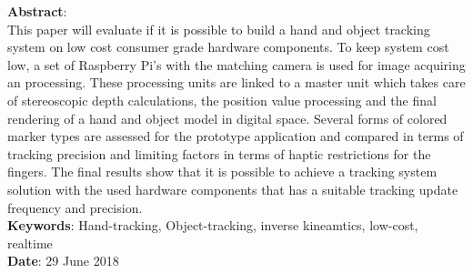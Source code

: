 \begin{titlepage}
\textbf{Abstract}: \\This paper will evaluate if it is possible to build a hand and object tracking system on low cost consumer grade hardware components. To keep system cost low, a set of Raspberry Pi's with the matching camera is used for image acquiring an processing. These processing units are linked to a master unit which takes care of stereoscopic depth calculations, the position value processing and the final rendering of a hand and object model in digital space. Several forms of colored marker types are assessed for the prototype application and compared in terms of tracking precision and limiting factors in terms of haptic restrictions for the fingers. The final results show that it is possible to achieve a tracking system solution with the used hardware components that has a suitable tracking update frequency and precision.\\
\textbf{Keywords}: Hand-tracking, Object-tracking, inverse kineamtics, low-cost, realtime \\
\textbf{Date}: 29 June 2018\\

\end{titlepage}
